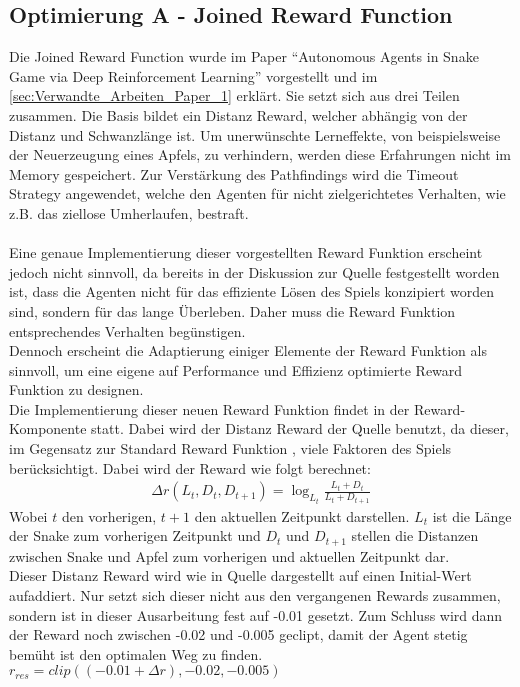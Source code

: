 \subsection{Optimierung A - Joined Reward Function} \label{subsec:Konzept_Optimierung01}
Die Joined Reward Function wurde im Paper "`Autonomous Agents in Snake Game via Deep Reinforcement Learning"' \cite{Autonomous_Agents_in_Snake_Game_via_DRL} vorgestellt und im \autoref{sec:Verwandte_Arbeiten_Paper_1} erklärt. Sie setzt sich aus drei Teilen zusammen. Die Basis bildet ein Distanz Reward, welcher abhängig von der Distanz und Schwanzlänge ist. Um unerwünschte Lerneffekte, von beispielsweise der Neuerzeugung eines Apfels, zu verhindern, werden diese Erfahrungen nicht im Memory gespeichert. Zur Verstärkung des Pathfindings wird die Timeout Strategy angewendet, welche den Agenten für nicht zielgerichtetes Verhalten, wie z.B. das ziellose Umherlaufen, bestraft.\\
\\Eine genaue Implementierung dieser vorgestellten Reward Funktion erscheint jedoch nicht sinnvoll, da bereits in der Diskussion  zur Quelle \cite{Autonomous_Agents_in_Snake_Game_via_DRL} festgestellt worden ist, dass die Agenten nicht für das effiziente Lösen des Spiels konzipiert worden sind, sondern für das lange Überleben. Daher muss die Reward Funktion entsprechendes Verhalten begünstigen.\\
Dennoch erscheint die Adaptierung einiger Elemente der Reward Funktion als sinnvoll, um eine eigene auf Performance und Effizienz optimierte Reward Funktion zu designen.\\
Die Implementierung dieser neuen Reward Funktion findet in der Reward-Komponente statt. 
Dabei wird der Distanz Reward der Quelle \cite{Autonomous_Agents_in_Snake_Game_via_DRL} benutzt, da dieser, im Gegensatz zur Standard Reward Funktion , viele Faktoren des Spiels berücksichtigt. Dabei wird der Reward wie folgt berechnet:
\begin{align}
	\Delta r(L_t, D_t,D_{t+1}) = \log_{L_t}\frac{L_t + D_t}{L_t + D_{t + 1}}
\end{align}
Wobei $t$ den vorherigen, $t+1$ den aktuellen Zeitpunkt darstellen. $L_t$ ist die Länge der Snake zum vorherigen Zeitpunkt und $D_t$ und $D_{t+1}$ stellen die Distanzen zwischen Snake und Apfel zum vorherigen und aktuellen Zeitpunkt dar.\\
Dieser Distanz Reward wird wie in Quelle \cite{Autonomous_Agents_in_Snake_Game_via_DRL} dargestellt auf einen Initial-Wert aufaddiert. Nur setzt sich dieser nicht aus den vergangenen Rewards zusammen, sondern ist in dieser Ausarbeitung fest auf -0.01 gesetzt. Zum Schluss wird dann der Reward noch zwischen -0.02 und -0.005 geclipt, damit der Agent stetig bemüht ist den optimalen Weg zu finden.
$r_{res} = clip((-0.01 + \Delta r), -0.02, -0.005)$

